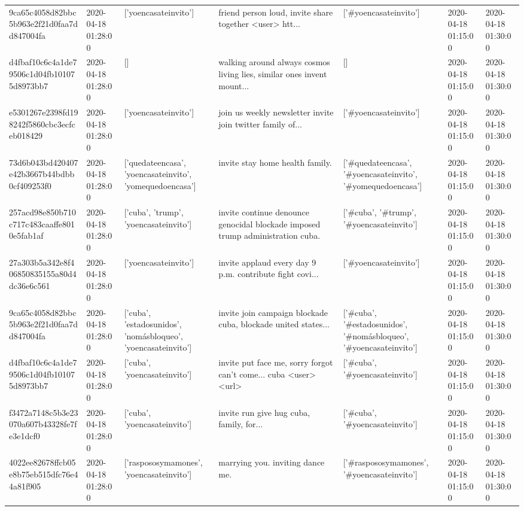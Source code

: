 \begin{tabular}{lllllll}
9ca65c4058d82bbc5b963e2f21d0faa7dd847004fa & 2020-04-18 01:28:00 & ['yoencasateinvito'] & friend person loud, invite share together <user> htt... & ['#yoencasateinvito'] & 2020-04-18 01:15:00 & 2020-04-18 01:30:00 \\
d4fbaf10c6c4a1de79506c1d04fb101075d8973bb7 & 2020-04-18 01:28:00 & [] & walking around always cosmos living lies, similar ones invent mount... & [] & 2020-04-18 01:15:00 & 2020-04-18 01:30:00 \\
e5301267e2398fd198242f5860cbc3ecfceb018429 & 2020-04-18 01:28:00 & ['yoencasateinvito'] & join us weekly newsletter invite join twitter family of... & ['#yoencasateinvito'] & 2020-04-18 01:15:00 & 2020-04-18 01:30:00 \\
73d6b043bd420407e42b3667b44bdbb0cf409253f0 & 2020-04-18 01:28:00 & ['quedateencasa', 'yoencasateinvito', 'yomequedoencasa'] & invite stay home health family. & ['#quedateencasa', '#yoencasateinvito', '#yomequedoencasa'] & 2020-04-18 01:15:00 & 2020-04-18 01:30:00 \\
257acd98e850b710c717c483caaffe8010e5fab1af & 2020-04-18 01:28:00 & ['cuba', 'trump', 'yoencasateinvito'] & invite continue denounce genocidal blockade imposed trump administration cuba. & ['#cuba', '#trump', '#yoencasateinvito'] & 2020-04-18 01:15:00 & 2020-04-18 01:30:00 \\
27a303b5a342e8f406850835155a80d4dc36e6c561 & 2020-04-18 01:28:00 & ['yoencasateinvito'] & invite applaud every day 9 p.m. contribute fight covi... & ['#yoencasateinvito'] & 2020-04-18 01:15:00 & 2020-04-18 01:30:00 \\
9ca65c4058d82bbc5b963e2f21d0faa7dd847004fa & 2020-04-18 01:28:00 & ['cuba', 'estadosunidos', 'nomásbloqueo', 'yoencasateinvito'] & invite join campaign blockade cuba, blockade united states... & ['#cuba', '#estadosunidos', '#nomásbloqueo', '#yoencasateinvito'] & 2020-04-18 01:15:00 & 2020-04-18 01:30:00 \\
d4fbaf10c6c4a1de79506c1d04fb101075d8973bb7 & 2020-04-18 01:28:00 & ['cuba', 'yoencasateinvito'] & invite put face me, sorry forgot can't come... cuba <user> <url> & ['#cuba', '#yoencasateinvito'] & 2020-04-18 01:15:00 & 2020-04-18 01:30:00 \\
f3472a7148c5b3e23070a607b43328fe7fe3e1dcf0 & 2020-04-18 01:28:00 & ['cuba', 'yoencasateinvito'] & invite run give hug cuba, family, for... & ['#cuba', '#yoencasateinvito'] & 2020-04-18 01:15:00 & 2020-04-18 01:30:00 \\
4022ee82678ffcb05e8b75eb515dfc76e44a81f905 & 2020-04-18 01:28:00 & ['raspososymamones', 'yoencasateinvito'] & marrying you. inviting dance me. & ['#raspososymamones', '#yoencasateinvito'] & 2020-04-18 01:15:00 & 2020-04-18 01:30:00 \\

\end{tabular}
